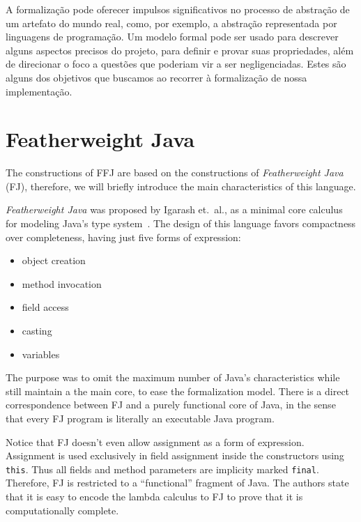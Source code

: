 A formalização pode oferecer impulsos significativos no processo de abstração de
um artefato do mundo real, como, por exemplo, a abstração representada por
linguagens de programação.  Um modelo formal pode ser usado para descrever
alguns aspectos precisos do projeto, para definir e provar suas propriedades,
além de direcionar o foco a questões que poderiam vir a ser negligenciadas.
Estes são alguns dos objetivos que buscamos ao recorrer à formalização de nossa
implementação.

\section{Featherweight Java}

The constructions of FFJ are based on the constructions of \textit{Featherweight
Java} (FJ), therefore, we will briefly introduce the main characteristics of
this language.

\textit{Featherweight Java} was proposed by Igarash et.\ al., as a minimal core
calculus for modeling Java's type system~\cite{Igarashi99featherweightjava}. The 
design of this language favors compactness over completeness, having just five 
forms of expression:
\begin{itemize}
    \item object creation
    \item method invocation
    \item field access
    \item casting 
    \item variables
\end{itemize}

The purpose was to omit the maximum number of Java's characteristics while still
maintain a the main core, to ease the formalization model.
There is a direct correspondence between FJ and a purely functional core of
Java, in the sense that every FJ program is literally an executable Java
program.

Notice that FJ doesn't even allow assignment as a form of expression.
Assignment is used exclusively in field assignment inside the  constructors
using \texttt{this}. Thus all fields and method parameters are implicity marked
\texttt{final}. Therefore, FJ is restricted to a ``functional'' fragment of
Java. The authors state that it is easy to encode the lambda calculus to FJ to
prove that it is computationally complete.

